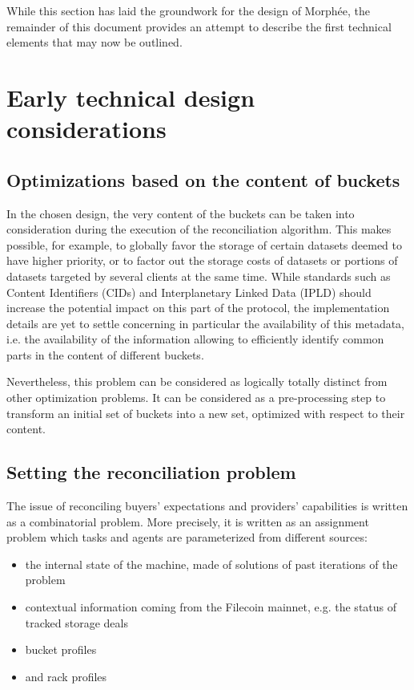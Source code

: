 \documentclass[twoside,twocolumn]{article}
\begin{document}
While this section has laid the groundwork for the design of Morphée,
the remainder of this document provides an attempt to describe the first technical elements that may now be outlined.


\section{Early technical design considerations}

\subsection{Optimizations based on the content of buckets}

In the chosen design, the very content of the buckets can be taken into consideration during the execution of the reconciliation algorithm.
This makes possible, for example, to globally favor the storage of certain datasets deemed to have higher priority,
or to factor out the storage costs of datasets or portions of datasets targeted by several clients at the same time.
While standards such as Content Identifiers (CIDs) and Interplanetary Linked Data (IPLD) should increase the potential impact on this part of the protocol,
the implementation details are yet to settle concerning in particular the availability of this metadata,
i.e. the availability of the information allowing to efficiently identify common parts in the content of different buckets.

Nevertheless, this problem can be considered as logically totally distinct from other optimization problems.
It can be considered as a pre-processing step to transform an initial set of buckets into a new set, optimized with respect to their content.


\subsection{Setting the reconciliation problem}

The issue of reconciling buyers' expectations and providers' capabilities is written as a combinatorial problem.
More precisely, it is written as an assignment problem which tasks and agents are parameterized from different sources:
\begin{itemize}
  \item the internal state of the machine, made of solutions of past iterations of the problem
  \item contextual information coming from the Filecoin mainnet, e.g. the status of tracked storage deals
  \item bucket profiles
  \item and rack profiles
\end{itemize}
\end{document}
